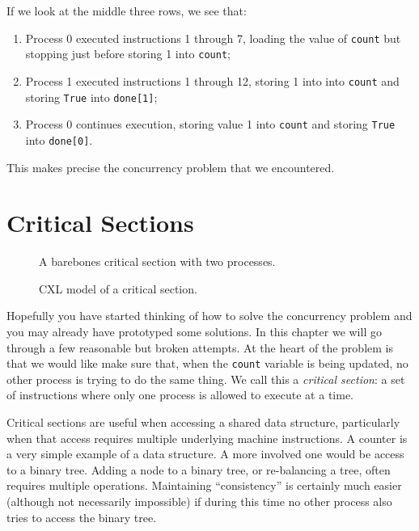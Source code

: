 \documentclass{report}
\newenvironment{code}{
\tcolorbox
}{
\endtcolorbox
}
\begin{document}
If we look at the middle three rows, we see that:
\begin{enumerate}
\item Process 0 executed instructions 1 through 7, loading the value of
\texttt{count} but stopping just before storing 1 into \texttt{count};
\item Process 1 executed instructions 1 through 12, storing 1 into
into \texttt{count} and storing \texttt{True} into \texttt{done[1]};
\item Process 0 continues execution, storing value 1 into \texttt{count}
and storing \texttt{True} into \texttt{done[0]}.
\end{enumerate}

This makes precise the concurrency problem that we encountered.

\chapter{Critical Sections}

\begin{figure}
\begin{code}
\end{code}
\caption{A barebones critical section with two processes.}
\label{fig:csbarebones}
\end{figure}

\begin{figure}
\begin{code}
\end{code}
\caption{CXL model of a critical section.}
\label{fig:cs}
\end{figure}

Hopefully you have started thinking of how to solve the concurrency
problem and you may already have prototyped some solutions.
In this chapter we will go through a few reasonable but broken attempts.
At the heart of the problem is that we would like make sure that, when
the \texttt{count} variable is being updated, no other process is
trying to do the same thing.  We call this a \emph{critical section}: a
set of instructions where only one process is allowed to execute at a
time.

Critical sections are useful when accessing a shared data
structure, particularly when that access requires multiple underlying
machine instructions.  A counter is a very simple example of
a data structure.  A more involved one would be access to a binary tree.
Adding a node to a binary tree, or re-balancing a tree, often requires
multiple operations.  Maintaining ``consistency'' is certainly much easier
(although not necessarily impossible) if during this time no other
process also tries to access the binary tree.
\end{document}

